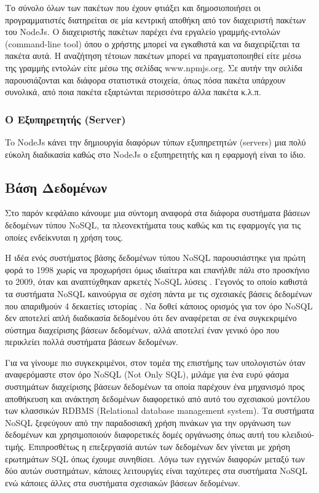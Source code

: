 		Το σύνολο όλων των πακέτων που έχουν φτιάξει και δημοσιοποιήσει οι προγραμματιστές διατηρείται σε μία κεντρική αποθήκη από τον διαχειριστή πακέτων του NodeJs. Ο διαχειριστής πακέτων παρέχει ένα εργαλείο γραμμής-εντολών (command-line tool) όπου ο χρήστης μπορεί να εγκαθιστά και να διαχειρίζεται τα πακέτα αυτά. H αναζήτηση τέτοιων πακέτων μπορεί να πραγματοποιηθεί είτε  μέσω της γραμμής εντολών είτε μέσω της σελίδας www.npmjs.org. Σε αυτήν την σελίδα παρουσιάζονται και διάφορα στατιστικά στοιχεία, όπως πόσα πακέτα υπάρχουν συνολικά, από ποια πακέτα εξαρτώνται περισσότερο άλλα πακέτα κ.λ.π. \cite{cantelon}

	\cite{Kaufm2009}	
		
		
	\subsubsection{Ο Εξυπηρετητής (Server)}
	
		To NodeJs κάνει την δημιουργία διαφόρων τύπων εξυπηρετητών (servers) μια πολύ εύκολη διαδικασία καθώς στο NodeJs ο εξυπηρετητής και η εφαρμογή είναι το ίδιο.

		
	\subsection{Βάση Δεδομένων}
	Στο παρόν κεφάλαιο κάνουμε μια σύντομη αναφορά στα διάφορα συστήματα βάσεων δεδομένων τύπου NoSQL, τα πλεονεκτήματα τους καθώς και τις εφαρμογές για τις οποίες ενδείκνυται η χρήση τους.
	
	Η ιδέα ενός συστήματος βάσης δεδομένων τύπου NoSQL παρουσιάστηκε για πρώτη φορά το 1998 χωρίς να προχωρήσει όμως ιδιαίτερα και επανήλθε πάλι στο προσκήνιο το 2009, όταν και αναπτύχθηκαν αρκετές NoSQL λύσεις \cite{5993686}. Γεγονός το οποίο καθιστά τα συστήματα NoSQL καινούργια σε σχέση πάντα με τις σχεσιακές βάσεις δεδομένων που απαριθμούν 4 δεκαετίες ιστορίας \cite{Codd:1970:RMD:362384.362685}. Να δοθεί κάποιος ορισμός για τον όρο NoSQL δεν αποτελεί απλή διαδικασία δεδομένου ότι δεν αναφέρεται σε ένα συγκεκριμένο σύστημα διαχείρισης βάσεων δεδομένων, αλλά αποτελεί έναν γενικό όρο που περικλείει πολλά συστήματα βάσεων δεδομένων.
	
	Για να γίνουμε πιο συγκεκριμένοι, στον τομέα της επιστήμης των υπολογιστών όταν αναφερόμαστε στον όρο NoSQL (Not Only SQL), μιλάμε για ένα ευρύ φάσμα συστημάτων διαχείρισης βάσεων δεδομένων τα οποία παρέχουν ένα μηχανισμό προς αποθήκευση και ανάκτηση δεδομένων διαφορετικό από αυτό του σχεσιακού μοντέλου των κλασσικών RDBMS (Relational database management system)\cite{Cattell:2011:SSN:1978915.1978919}\cite{6106531}. Τα συστήματα NoSQL ξεφεύγουν από την παραδοσιακή χρήση πινάκων για την οργάνωση των δεδομένων και χρησιμοποιούν διαφορετικές δομές οργάνωσης όπως αυτή του κλειδιού-τιμής. Επιπροσθέτως η επεξεργασίά αυτών των δεδομένων δεν γίνεται με χρήση ερωτημάτων SQL όπως έχουμε συνηθίσει. Λόγω των εγγενών διαφορών μεταξύ των δύο αυτών συστημάτων, κάποιες λειτουργίες είναι ταχύτερες στα συστήματα NoSQL ενώ κάποιες άλλες στα συστήματα σχεσιακών βάσεων δεδομένων.
	
